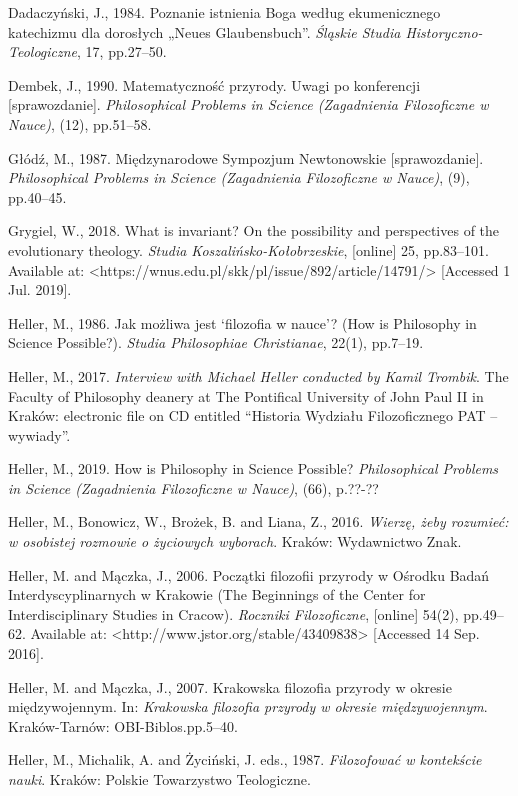 \documentclass[a4paper]{article}
\begin{document}
Dadaczyński, J., 1984. Poznanie istnienia Boga według ekumenicznego katechizmu dla dorosłych „Neues Glaubensbuch”.
\textit{Śląskie Studia Historyczno-Teologiczne}, 17, pp.27–50.

Dembek, J., 1990. Matematyczność przyrody. Uwagi po konferencji [sprawozdanie]. \textit{Philosophical Problems in
Science (Zagadnienia Filozoficzne w Nauce)}, (12), pp.51–58.

Głódź, M., 1987. Międzynarodowe Sympozjum Newtonowskie [sprawozdanie]. \textit{Philosophical Problems in Science
(Zagadnienia Filozoficzne w Nauce)}, (9), pp.40–45.

Grygiel, W., 2018. What is invariant? On the possibility and perspectives of the evolutionary theology. \textit{Studia
Koszalińsko-Kołobrzeskie}, [online] 25, pp.83–101. Available at:
{\textless}https://wnus.edu.pl/skk/pl/issue/892/article/14791/{\textgreater} [Accessed 1 Jul. 2019].

Heller, M., 1986. Jak możliwa jest ‘filozofia w nauce’? (How is Philosophy in Science Possible?). \textit{Studia
Philosophiae Christianae}, 22(1), pp.7–19.

Heller, M., 2017. \textit{Interview with Michael Heller conducted by Kamil Trombik}. The Faculty of Philosophy deanery
at The Pontifical University of John Paul II in Kraków: electronic file on CD entitled “Historia Wydziału
Filozoficznego PAT – wywiady”.

Heller, M., 2019. How is Philosophy in Science Possible? \textit{Philosophical Problems in Science (Zagadnienia
Filozoficzne w Nauce)}, (66), p.??-??

Heller, M., Bonowicz, W., Brożek, B. and Liana, Z., 2016. \textit{Wierzę, żeby rozumieć: w osobistej rozmowie o
życiowych wyborach}. Kraków: Wydawnictwo Znak.

Heller, M. and Mączka, J., 2006. Początki filozofii przyrody w Ośrodku Badań Interdyscyplinarnych w Krakowie (The
Beginnings of the Center for Interdisciplinary Studies in Cracow). \textit{Roczniki Filozoficzne}, [online] 54(2),
pp.49–62. Available at: {\textless}http://www.jstor.org/stable/43409838{\textgreater} [Accessed 14 Sep. 2016].

Heller, M. and Mączka, J., 2007. Krakowska filozofia przyrody w okresie międzywojennym. In: \textit{Krakowska filozofia
przyrody w okresie międzywojennym}. Kraków-Tarnów: OBI-Biblos.pp.5–40.

Heller, M., Michalik, A. and Życiński, J. eds., 1987. \textit{Filozofować w kontekście nauki}. Kraków: Polskie
Towarzystwo Teologiczne.
\end{document}
